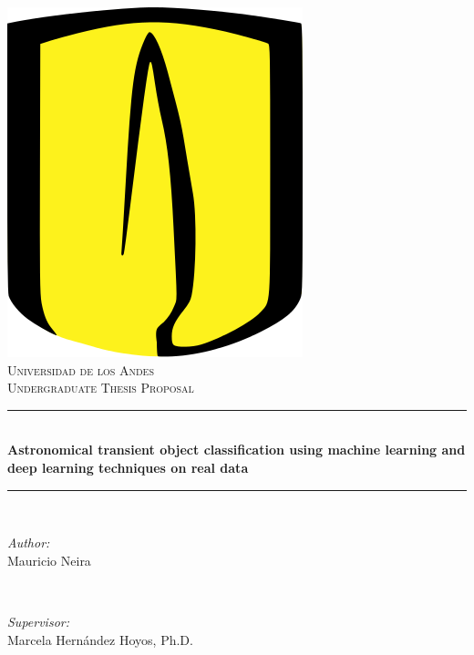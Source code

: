 \begin{titlepage}

\newcommand{\HRule}{\rule{\linewidth}{0.5mm}} %

\center %



 
\includegraphics[width=0.3\columnwidth]{University_of_Los_Andes_logo.png}\\[1cm] %
\textsc{\Large Universidad de los Andes}\\[1.5cm] %
\textsc{\large Undergraduate Thesis Proposal}\\[0.5cm] %


\HRule \\[0.4cm]
{ \Large \bfseries Astronomical transient object classification using machine learning and deep learning techniques on real data}\\[0.4cm] %
\HRule \\[1.5cm]
 

\begin{minipage}{0.4\textwidth}
\begin{flushleft} \large
\emph{Author:}\\
Mauricio Neira %
\end{flushleft}
\end{minipage}
~
\begin{minipage}{0.5\textwidth}
\begin{flushright} \large
\emph{Supervisor:} \\
Marcela Hernández Hoyos, Ph.D. %
\end{flushright}
\end{minipage}\\[2cm]


\end{titlepage}
